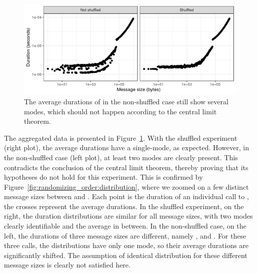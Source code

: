         \begin{figure}[htpb]
            \centering
            \includegraphics[width=0.8\linewidth]{img/experiment/randomizing_order/aggregated_data.png}
            \caption{The average durations of \recv in the non-shuffled case still show several modes,
            which should not happen according to the central limit theorem.}%
            \label{fig:randomizing_order:avg_data}
        \end{figure}

        The aggregated data is presented in Figure~\ref{fig:randomizing_order:avg_data}. With the shuffled experiment
        (right plot), the average durations have a single-mode, as expected. However, in the non-shuffled case (left
        plot), at least two modes are clearly present. This contradicts the conclusion of the central limit theorem,
        thereby proving that its hypotheses do not hold for this experiment. This is confirmed by
        Figure~\ref{fig:randomizing_order:distribution}, where we zoomed on a few distinct message sizes between
         and . Each point is the duration of an individual call to \recv,
        the crosses represent the average durations. In the shuffled experiment, on the right, the duration
        distributions are similar for all message sizes, with two modes clearly identifiable and the average in between.
        In the non-shuffled case, on the left, the durations of three message sizes are different, namely
        ,  and . For these three calls, the distributions have only one
        mode, so their average durations are significantly shifted. The assumption of identical distribution for these
        different message sizes is clearly not satisfied here.

